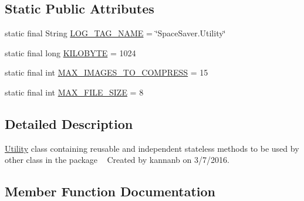 \subsection*{Static Public Attributes}
\begin{DoxyCompactItemize}
\item 
static final String \hyperlink{classcourse_1_1examples_1_1spacesaver_1_1_utility_a306cf6f2267973d242405123fc51c775}{L\+O\+G\+\_\+\+T\+A\+G\+\_\+\+N\+A\+M\+E} = \char`\"{}Space\+Saver.\+Utility\char`\"{}
\item 
static final long \hyperlink{classcourse_1_1examples_1_1spacesaver_1_1_utility_a291dacb443d1ba16e25c95b0b436b6ec}{K\+I\+L\+O\+B\+Y\+T\+E} = 1024
\item 
static final int \hyperlink{classcourse_1_1examples_1_1spacesaver_1_1_utility_a8953f2c1e57838e6e76c22071b4e5a02}{M\+A\+X\+\_\+\+I\+M\+A\+G\+E\+S\+\_\+\+T\+O\+\_\+\+C\+O\+M\+P\+R\+E\+S\+S} = 15
\item 
static final int \hyperlink{classcourse_1_1examples_1_1spacesaver_1_1_utility_a633bce4a44e4cab909e8bac6bbc4caab}{M\+A\+X\+\_\+\+F\+I\+L\+E\+\_\+\+S\+I\+Z\+E} = 8
\end{DoxyCompactItemize}


\subsection{Detailed Description}
\hyperlink{classcourse_1_1examples_1_1spacesaver_1_1_utility}{Utility} class containing reusable and independent stateless methods to be used by other class in the package ~\newline
 Created by kannanb on 3/7/2016. 

\subsection{Member Function Documentation}
\hypertarget{classcourse_1_1examples_1_1spacesaver_1_1_utility_a6e99256bde02985ef71df62265c56217}{}
